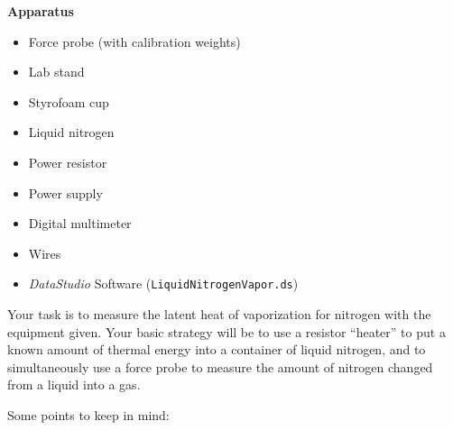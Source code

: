 \textbf{Apparatus}
\begin{itemize}
\item Force probe (with calibration weights)
\item Lab stand
\item Styrofoam cup
\item Liquid nitrogen
\item Power resistor
\item Power supply
\item Digital multimeter
\item Wires
\item \textit{DataStudio} Software (\texttt{LiquidNitrogenVapor.ds})
\end{itemize}

Your task is to measure the latent heat of vaporization for nitrogen with the equipment given.
Your basic strategy will be to use a resistor ``heater'' to put a known amount of thermal
energy into a container of liquid nitrogen, and to simultaneously use a force probe to
measure the amount of nitrogen changed from a liquid into a gas.

Some points to keep in mind:

